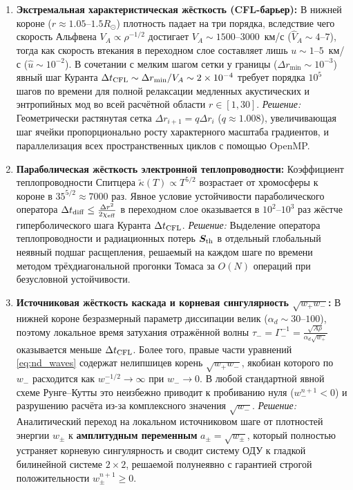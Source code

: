 \documentclass[11pt,a4paper]{article}
\begin{document}
\begin{enumerate}
\item \textbf{Экстремальная характеристическая жёсткость (CFL-барьер):}
В нижней короне ($r \approx 1.05\text{--}1.5 R_\odot$) плотность падает на три порядка, вследствие чего скорость Альфвена $V_A \propto \rho^{-1/2}$ достигает $V_A \sim 1500\text{--}3000$~км/с ($\hat{V}_A \sim 4\text{--}7$), тогда как скорость втекания в переходном слое составляет лишь $u \sim 1\text{--}5$~км/с ($\hat{u} \sim 10^{-2}$). В сочетании с мелким шагом сетки у границы ($\Delta r_{\min} \sim 10^{-3}$) явный шаг Куранта $\Delta t_{\rm CFL} \sim \Delta r_{\min}/V_A \sim 2\times 10^{-4}$ требует порядка $10^5$ шагов по времени для полной релаксации медленных акустических и энтропийных мод во всей расчётной области $r \in [1, 30]$.
\emph{Решение:} Геометрически растянутая сетка $\Delta r_{i+1} = q\Delta r_i$ ($q \approx 1.008$), увеличивающая шаг ячейки пропорционально росту характерного масштаба градиентов, и параллелизация всех пространственных циклов с помощью OpenMP.

\item \textbf{Параболическая жёсткость электронной теплопроводности:}
Коэффициент теплопроводности Спитцера $\tilde{\kappa}(T) \propto T^{5/2}$ возрастает от хромосферы к короне в $35^{5/2} \approx 7000$ раз. Явное условие устойчивости параболического оператора $\Delta t_{\rm diff} \le \frac{\Delta r^2}{2\chi_{\rm eff}}$ в переходном слое оказывается в $10^2\text{--}10^3$ раз жёстче гиперболического шага Куранта $\Delta t_{\rm CFL}$.
\emph{Решение:} Выделение оператора теплопроводности и радиационных потерь $\bm{S}_{\rm th}$ в отдельный глобальный неявный подшаг расщепления, решаемый на каждом шаге по времени методом трёхдиагональной прогонки Томаса за $O(N)$ операций при безусловной устойчивости.

\item \textbf{Источниковая жёсткость каскада и корневая сингулярность $\sqrt{w_+ w_-}$:}
В нижней короне безразмерный параметр диссипации велик ($\alpha_d \sim 30\text{--}100$), поэтому локальное время затухания отражённой волны $\tau_- = \Gamma_-^{-1} = \frac{\sqrt{A\rho}}{\alpha_d\sqrt{w_+}}$ оказывается меньше $\Delta t_{\rm CFL}$. Более того, правые части уравнений \eqref{eq:nd_waves} содержат нелипшицев корень $\sqrt{w_+ w_-}$, якобиан которого по $w_-$ расходится как $w_-^{-1/2} \to \infty$ при $w_- \to 0$. В любой стандартной явной схеме Рунге--Кутты это неизбежно приводит к пробиванию нуля ($w_-^{n+1} < 0$) и разрушению расчёта из-за комплексного значения $\sqrt{w_-}$.
\emph{Решение:} Аналитический переход на локальном источниковом шаге от плотностей энергии $w_\pm$ к \textbf{амплитудным переменным} $a_\pm = \sqrt{w_\pm}$, который полностью устраняет корневую сингулярность и сводит систему ОДУ к гладкой билинейной системе $2 \times 2$, решаемой полунеявно с гарантией строгой положительности $w_\pm^{n+1} \ge 0$.


\end{enumerate}
\end{document}
